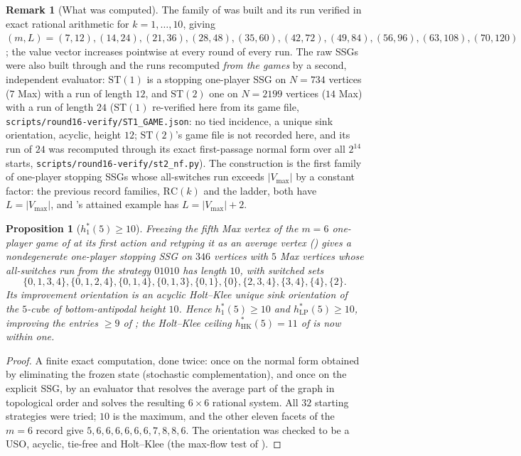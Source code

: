 \documentclass[11pt]{article}
\theoremstyle{plain}
\newtheorem{proposition}[theorem]{Proposition}
\theoremstyle{definition}
\newtheorem{remark}[theorem]{Remark}
\newcommand{\Vmax}{V_{\max}}
\begin{document}
\begin{remark}[What was computed]\label{rem:stack-measured}
The family of  was built and its run verified in exact rational
arithmetic for $k=1,\dots,10$, giving
$(m,L)=(7,12),(14,24),(21,36),(28,48),(35,60),(42,72),(49,84),(56,96),(63,108),(70,120)$;
the value vector increases pointwise at every round of every run. The raw SSGs were
also built through  and the runs recomputed \emph{from the games}
by a second, independent evaluator: $\mathrm{ST}(1)$ is a stopping one-player SSG on
$N=734$ vertices ($7$ Max) with a run of length $12$, and $\mathrm{ST}(2)$ one on
$N=2199$ vertices ($14$ Max) with a run of length $24$ ($\mathrm{ST}(1)$
re-verified here from its game file,
\texttt{scripts/round16-verify/ST1\_GAME.json}: no tied incidence, a
unique sink orientation, acyclic, height $12$; $\mathrm{ST}(2)$'s game file
is not recorded here, and its run of $24$ was recomputed through its exact
first-passage normal form over all $2^{14}$ starts,
\texttt{scripts/round16-verify/st2\_nf.py}). The construction is the first
family of one-player stopping SSGs whose all-switches run exceeds $|\Vmax|$ by a
constant factor: the previous record families, $\mathrm{RC}(k)$ and the ladder, both
have $L=|\Vmax|$, and 's attained example has $L=|\Vmax|+2$.
\end{remark}

\begin{proposition}[$h^{\ast}_{1}(5)\ge10$]\label{prop:hstar-one-five}
Freezing the fifth Max vertex of the $m=6$ one-player game of  at its
first action and retyping it as an average vertex () gives a
nondegenerate one-player stopping SSG on $346$ vertices with $5$ Max vertices whose
all-switches run from the strategy $01010$ has length $10$, with switched sets
\[
 \{0,1,3,4\},\{0,1,2,4\},\{0,1,4\},\{0,1,3\},\{0,1\},\{0\},\{2,3,4\},\{3,4\},\{4\},\{2\}.
\]
Its improvement orientation is an acyclic Holt--Klee unique sink orientation of the
$5$-cube of bottom-antipodal height $10$. Hence $h^{\ast}_{1}(5)\ge10$ and
$h^{\ast}_{\mathrm{LP}}(5)\ge10$, improving the entries $\ge9$ of
; the Holt--Klee ceiling $h^{\ast}_{\mathrm{HK}}(5)=11$ of
 is now within one.
\end{proposition}

\begin{proof}
A finite exact computation, done twice: once on the normal form obtained by
eliminating the frozen state (stochastic complementation), and once on the explicit
SSG, by an evaluator that resolves the average part of the graph in topological order
and solves the resulting $6\times6$ rational system. All $32$ starting strategies were
tried; $10$ is the maximum, and the other eleven facets of the $m=6$ record give
$5,6,6,6,6,6,6,7,8,8,6$. The orientation was checked to be a USO, acyclic, tie-free
and Holt--Klee (the max-flow test of ).
\end{proof}
\end{document}
